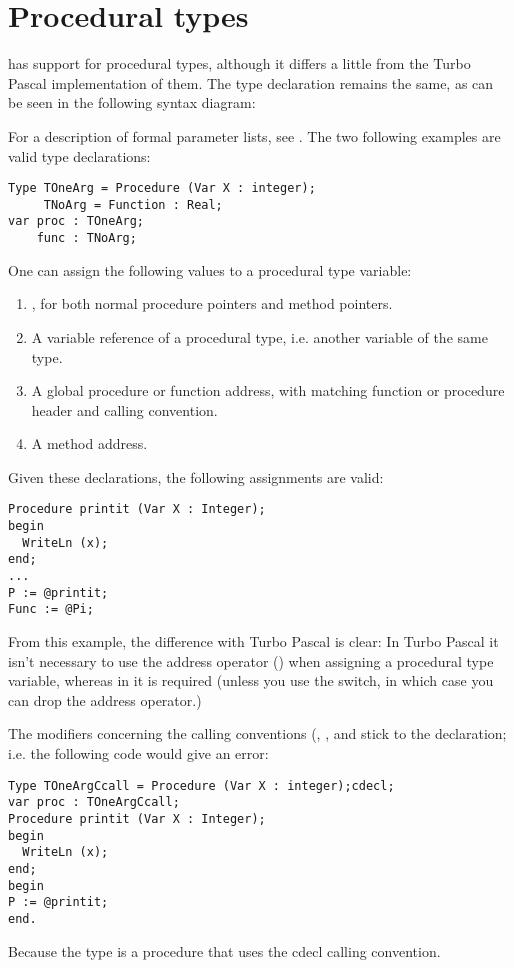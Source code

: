 \documentclass{report}
\begin{document}
\section{Procedural types}
\fpc has support for procedural types, although it differs a little from
the Turbo Pascal implementation of them. The type declaration remains the
same, as can be seen in the following syntax diagram:

For a description of formal parameter lists, see .
The two following examples are valid type declarations:
\begin{verbatim}
Type TOneArg = Procedure (Var X : integer);
     TNoArg = Function : Real;
var proc : TOneArg;
    func : TNoArg;
\end{verbatim}
One can assign the following values to a procedural type variable:
\begin{enumerate}
\item {}, for both normal procedure pointers and method pointers.
\item A variable reference of a procedural type, i.e. another variable of
the same type.
\item A global procedure or function address, with matching function or
procedure header and calling convention.
\item A method address.
\end{enumerate}
Given these declarations, the following assignments are valid:
\begin{verbatim}
Procedure printit (Var X : Integer);
begin
  WriteLn (x);
end;
...
P := @printit;
Func := @Pi;
\end{verbatim}
From this example, the difference with Turbo Pascal is clear: In Turbo
Pascal it isn't necessary to use the address operator ()
when assigning a procedural type variable, whereas in \fpc it is required
(unless you use the  switch, in which case you can drop the address
operator.)
\begin{remark} The modifiers concerning the calling conventions (,
,  and  stick to the declaration;
i.e. the following code would give an error:
\begin{verbatim}
Type TOneArgCcall = Procedure (Var X : integer);cdecl;
var proc : TOneArgCcall;
Procedure printit (Var X : Integer);
begin
  WriteLn (x);
end;
begin
P := @printit;
end.
\end{verbatim}
Because the  type is a procedure that uses the cdecl
calling convention.
\end{remark}
\end{document}
